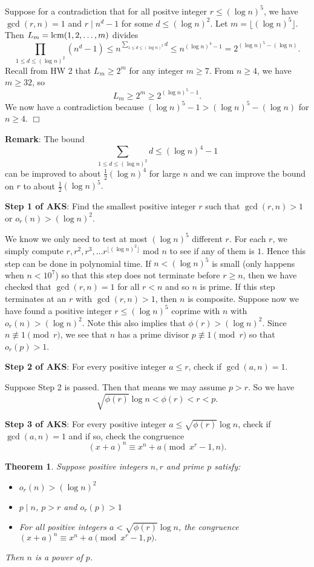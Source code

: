 \documentclass{article}
\def\lcm{{\rm lcm}}
\def\v{{\vspace{5pt}}}
\newtheorem{theorem}[subsection]{Theorem}
\newenvironment{proof}{\noindent {\bf Proof:}}{$\Box$ \vspace{2 ex}}
\begin{document}
\begin{proof}
    Suppose for a contradiction that for all positve integer $r\leq (\log n)^5$, we have $\gcd(r,n) = 1$ and $r\mid n^d - 1$ for some $d\leq (\log n)^2$. Let $m = \lfloor(\log n)^5\rfloor$. Then $L_m = \lcm(1,2,\ldots,m)$ divides
    $$\prod_{1\leq d\leq (\log n)^2} (n^d - 1) \leq n^{\sum_{1\leq d\leq (\log n)^2}d} \leq n^{(\log n)^4 - 1} = 2^{(\log n)^5 - (\log n)}.$$
    Recall from HW 2 that $L_{m}\geq 2^m$ for any integer $m\geq7$. From $n\geq 4$, we have $m\geq 32$, so $$L_m\geq 2^m\geq 2^{(\log n)^5 - 1}.$$
    We now have a contradiction because $(\log n)^5 - 1 > (\log n)^5 - (\log n)$ for $n\geq 4$.
\end{proof}

\noindent\textbf{Remark}: The bound $$\displaystyle\sum_{1\leq d\leq (\log n)^2}d \leq (\log n)^4 - 1$$ can be improved to about $\frac12(\log n)^4$ for large $n$ and we can improve the bound on $r$ to about $\frac12(\log n)^5.$

\vspace{5pt}
\noindent\textbf{Step 1 of AKS}: Find the smallest positive integer $r$ such that $\gcd(r,n) > 1$ or $o_r(n) > (\log n)^2$. 

\v
We know we only need to test at most $(\log n)^5$ different $r$. For each $r$, we simply compute $r, r^2, r^3, \ldots r^{\lfloor(\log n)^2\rfloor}$ mod $n$ to see if any of them is $1$. Hence this step can be done in polynomial time. If $n<(\log n)^5$ is small (only happens when $n < 10^7$) so that this step does not terminate before $r \geq n$, then we have checked that $\gcd(r,n) = 1$ for all $r < n$ and so $n$ is prime. If this step terminates at an $r$ with $\gcd(r,n) > 1$, then $n$ is composite. Suppose now we have found a positive integer $r\leq (\log n)^5$ coprime with $n$ with $o_r(n) > (\log n)^2$. Note this also implies that $\phi(r) > (\log n)^2$. Since $n\not\equiv 1\pmod{r}$, we see that $n$ has a prime divisor $p\not\equiv1\pmod{r}$ so that $o_r(p) > 1$.

\vspace{5pt}
\noindent\textbf{Step 2 of AKS}: For every positive integer $a \leq r$, check if $\gcd(a,n) = 1$.

\v
Suppose Step 2 is passed. Then that means we may assume $p > r$. So we have
$$\sqrt{\phi(r)}\log n < \phi(r) < r < p.$$

\vspace{5pt}
\noindent\textbf{Step 3 of AKS}: For every positive integer $a \leq \sqrt{\phi(r)}\log n$, check if $\gcd(a,n) = 1$ and if so, check the congruence
$$(x + a)^n \equiv x^n + a\pmod{x^r -1, n}.$$
\begin{theorem}\label{thm:mainAKS}
    Suppose positive integers $n,r$ and prime $p$ satisfy:
    \begin{itemize}
        \item $o_r(n) > (\log n)^2$
        \item $p\mid n$, $p> r$ and $o_r(p) > 1$
        \item For all positive integers $a < \sqrt{\phi(r)}\log n$, the congruence
        $(x + a)^n \equiv x^n + a\pmod{x^r -1, p}.$
    \end{itemize}
    Then $n$ is a power of $p$.
\end{theorem}
\end{document}
